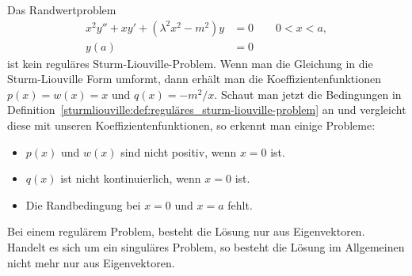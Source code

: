 \begin{beispiel}
	Das Randwertproblem
	\begin{equation}
		\begin{aligned}
		x^2y'' + xy' + (\lambda^2x^2 - m^2)y &= 0 \qquad 0<x<a,\\
		y(a) &= 0
		\end{aligned}
	\end{equation}
	ist kein reguläres Sturm-Liouville-Problem.
	Wenn man die Gleichung in die Sturm-Liouville Form umformt, dann
	erhält man
	die Koeffizientenfunktionen $p(x) = w(x) = x$ und $q(x) = -m^2/x$.
	Schaut man jetzt die Bedingungen in
	Definition~\ref{sturmliouville:def:reguläres_sturm-liouville-problem} an und 
	vergleicht diese mit unseren Koeffizientenfunktionen, so erkennt man einige
	Probleme:
	\begin{itemize}
		\item $p(x)$ und $w(x)$ sind nicht positiv, wenn $x = 0$ ist.
		\item $q(x)$ ist nicht kontinuierlich, wenn $x = 0$ ist.
		\item Die Randbedingung bei $x = 0$ und $x = a$ fehlt.
	\end{itemize}
\end{beispiel}

Bei einem regulärem Problem, besteht die Lösung nur aus Eigenvektoren.
Handelt es sich um ein singuläres Problem, so besteht die Lösung im Allgemeinen
nicht mehr nur aus Eigenvektoren.
 
